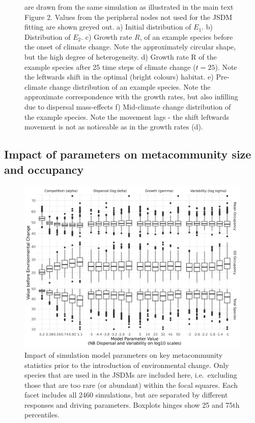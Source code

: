 \documentclass[
]{article}
\begin{document}
\begin{figure}
{are drawn from the same simulation as illustrated in the main text
Figure 2. Values from the peripheral nodes not used for the JSDM fitting
are shown greyed out. a) Initial distribution of \(E_1\). b)
Distribution of \(E_2\). c) Growth rate \(R\), of an example species
before the onset of climate change. Note the approximately circular
shape, but the high degree of heterogeneity. d) Growth rate R of the
example species after 25 time steps of climate change (\(t=25\)). Note
the leftwards shift in the optimal (bright colours) habitat. e)
Pre-climate change distribution of an example species. Note the
approximate correspondence with the growth rates, but also infilling due
to dispersal mass-effects f) Mid-climate change distribution of the
example species. Note the movement lags - the shift leftwards movement
is not as noticeable as in the growth rates (d).}
\end{figure}

\hypertarget{impact-of-parameters-on-metacommunity-size-and-occupancy}{%
\subsection{Impact of parameters on metacommunity size and
occupancy}\label{impact-of-parameters-on-metacommunity-size-and-occupancy}}

\begin{figure}
\centering
\includegraphics{SimulationMarkdowns/Figures/OccuBefore.png}
\caption{Impact of simulation model parameters on key metacommunity
statistics prior to the introduction of environmental change. Only
species that are used in the JSDMs are included here, i.e.~excluding
those that are too rare (or abundant) within the focal squares. Each
facet includes all 2460 simulations, but are separated by different
responses and driving parameters. Boxplots hinges show 25 and 75th
percentiles.}
\end{figure}
\end{document}
